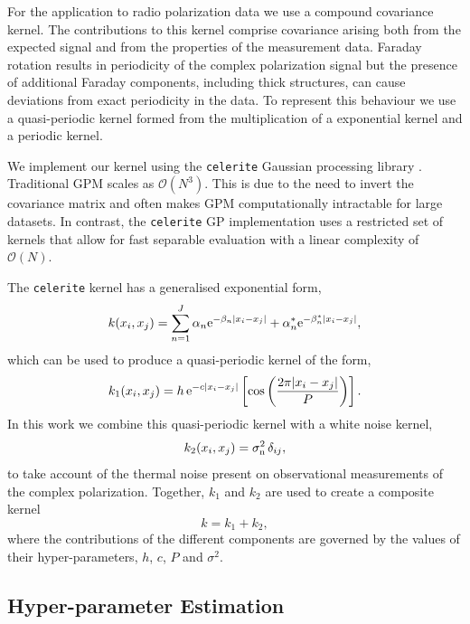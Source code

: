 \documentclass[fleqn,usenatbib]{mnras}
\begin{document}
For the application to radio polarization data we use a compound covariance kernel. The contributions to this kernel comprise covariance arising both from the expected signal and from the properties of the measurement data. Faraday rotation results in periodicity of the complex polarization signal but the presence of additional Faraday components, including thick structures, can cause deviations from exact periodicity in the data. To represent this behaviour we use a quasi-periodic kernel formed from the multiplication of a exponential kernel and a periodic kernel.

We implement our kernel using the {\tt celerite} Gaussian processing library \citep{celerite}. Traditional GPM scales as $\mathcal{O}(N^3)$. This is due to the need to invert the covariance matrix and often makes GPM computationally intractable for large datasets. In contrast,  the {\tt celerite} GP implementation uses a restricted set of kernels that allow for fast separable evaluation with a linear complexity of $\mathcal{O}(N)$.

The {\tt celerite} kernel has a generalised exponential form,
%
\begin{equation}
    k(x_i,x_j) = \sum_{n=1}^{J}{\alpha_n {\rm e}^{-\beta_n |x_i - x_j|} + \alpha_n^{\ast} {\rm e}^{-\beta_n^{\ast} |x_i - x_j|}},
\end{equation}
%
which can be used to produce a quasi-periodic kernel of the form,
%
\begin{equation}
\label{eq:celkernel}
k_1(x_i,x_j)=h\,{\rm e}^{-c|x_i - x_j|}\left[\cos\left(\frac{2\pi|x_i - x_j|}{P}\right)\right].
\end{equation}
%
In this work we combine this quasi-periodic kernel with a white noise kernel,
%
\begin{equation}
\label{eq:whitekernel}
k_2(x_i,x_j)=\sigma_{\rm n}^2\,\delta_{ij},
\end{equation}
%
to take account of the thermal noise present on observational measurements of the complex polarization. Together, $k_1$ and $k_2$ are used to create a composite kernel
%
\begin{equation}
k = k_1 + k_2,
\end{equation}
%
where the contributions of the different components are governed by the values of their hyper-parameters, $h$, $c$, $P$ and $\sigma^2$.

\subsection{Hyper-parameter Estimation}
\label{sec:parms}
\end{document}
